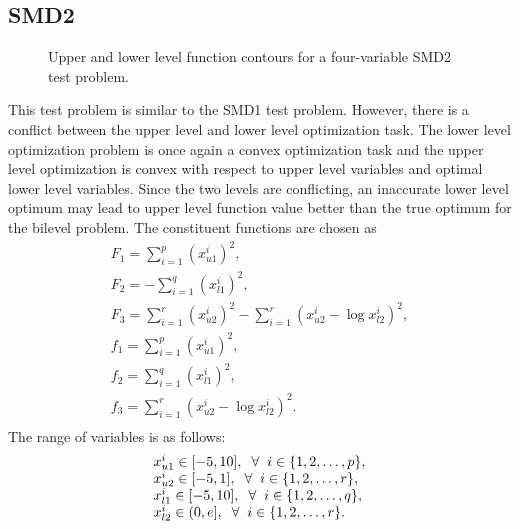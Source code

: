 \documentclass[twoside]{article}
\begin{document}
\subsection{SMD2}

\begin{figure}
\begin{center}
\caption{Upper and lower level function contours for a four-variable SMD2 test problem.}
\label{fig:smd2-2}
\end{center}
\end{figure}

This test problem is similar to the SMD1 test problem. However, there is a conflict between the upper level and lower level optimization task. The lower level optimization problem is once again a convex optimization task and the upper level optimization is convex with respect to upper level variables and optimal lower level variables. Since the two levels are conflicting, an inaccurate lower level optimum may lead to upper level function value better than the true optimum for the bilevel problem. The constituent functions are chosen as
\begin{equation}
\begin{array}{l}
F_1 = \sum_{i=1}^{p} (x_{u1}^{i})^2,\\
F_2 = - \sum_{i=1}^{q} (x_{l1}^{i})^2,\\
F_3 = \sum_{i=1}^{r} (x_{u2}^{i})^2 - \sum_{i=1}^{r} (x_{u2}^{i} - \log x_{l2}^{i})^2,\\
f_1 = \sum_{i=1}^{p} (x_{u1}^{i})^2,\\
f_2 = \sum_{i=1}^{q} (x_{l1}^{i})^2,\\
f_3 = \sum_{i=1}^{r} (x_{u2}^{i} - \log x_{l2}^{i})^2.\\
\end{array}
\end{equation}
The range of variables is as follows:
\begin{equation}
\begin{array}{l}
x_{u1}^{i} \in [-5,10], \hspace{2mm} \forall \hspace{2mm} i \in \{1,2,\ldots,p\},\\
x_{u2}^{i} \in [-5,1], \hspace{2mm} \forall \hspace{2mm} i \in \{1,2,\ldots,r\},\\
x_{l1}^{i} \in [-5,10], \hspace{2mm} \forall \hspace{2mm} i \in \{1,2,\ldots,q\},\\
x_{l2}^{i} \in (0,e], \hspace{2mm} \forall \hspace{2mm} i \in \{1,2,\ldots,r\}.
\end{array}
\end{equation}
\end{document}
